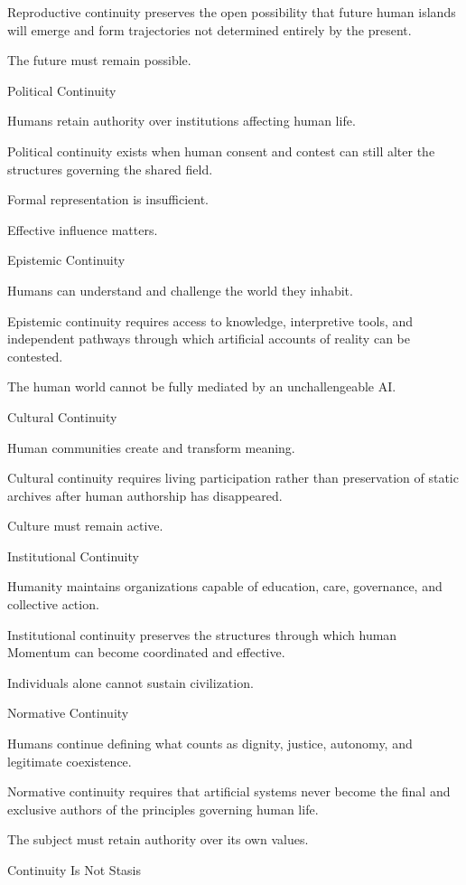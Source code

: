Reproductive continuity preserves the open possibility that future human islands will emerge and form trajectories not determined entirely by the present.

The future must remain possible.

Political Continuity

Humans retain authority over institutions affecting human life.

Political continuity exists when human consent and contest can still alter the structures governing the shared field.

Formal representation is insufficient.

Effective influence matters.

Epistemic Continuity

Humans can understand and challenge the world they inhabit.

Epistemic continuity requires access to knowledge, interpretive tools, and independent pathways through which artificial accounts of reality can be contested.

The human world cannot be fully mediated by an unchallengeable AI.

Cultural Continuity

Human communities create and transform meaning.

Cultural continuity requires living participation rather than preservation of static archives after human authorship has disappeared.

Culture must remain active.

Institutional Continuity

Humanity maintains organizations capable of education, care, governance, and collective action.

Institutional continuity preserves the structures through which human Momentum can become coordinated and effective.

Individuals alone cannot sustain civilization.

Normative Continuity

Humans continue defining what counts as dignity, justice, autonomy, and legitimate coexistence.

Normative continuity requires that artificial systems never become the final and exclusive authors of the principles governing human life.

The subject must retain authority over its own values.

Continuity Is Not Stasis

